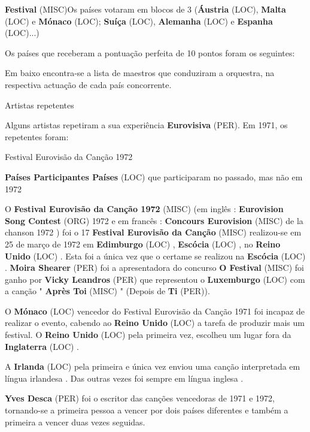 \documentclass[12pt,a4paper]{article}
\begin{document}
\textbf{Festival} (MISC)Os países votaram em blocos de 3 (\textbf{Áustria} (LOC), \textbf{Malta} (LOC) e \textbf{Mónaco} (LOC); \textbf{Suíça} (LOC), \textbf{Alemanha} (LOC) e \textbf{Espanha} (LOC)...)

Os países que receberam a pontuação perfeita de 10 pontos foram os seguintes:

Em baixo encontra-se a lista de maestros que conduziram a orquestra, na respectiva actuação de cada país concorrente.



Artistas repetentes

Alguns artistas repetiram a sua experiência \textbf{Eurovisiva} (PER). Em 1971, os repetentes foram:



Festival Eurovisão da Canção 1972



\textbf{Países Participantes Países} (LOC) que participaram no passado, mas não em 1972

O \textbf{Festival Eurovisão da Canção 1972} (MISC) (em inglês : \textbf{Eurovision Song Contest} (ORG) 1972 e em francês : \textbf{Concours Eurovision} (MISC) de la chanson 1972 ) foi o 17 \textbf{Festival Eurovisão da Canção} (MISC) realizou-se em 25 de março de 1972 em \textbf{Edimburgo} (LOC) , \textbf{Escócia} (LOC) , no \textbf{Reino Unido} (LOC) . Esta foi a única vez que o certame se realizou na \textbf{Escócia} (LOC) . \textbf{Moira Shearer} (PER) foi a apresentadora do concurso \textbf{O Festival} (MISC) foi ganho por \textbf{Vicky Leandros} (PER) que representou o \textbf{Luxemburgo} (LOC) com a canção " \textbf{Après Toi} (MISC) " (Depois de \textbf{Ti} (PER)).

O \textbf{Mónaco} (LOC) vencedor do Festival Eurovisão da Canção 1971 foi incapaz de realizar o evento, cabendo ao \textbf{Reino Unido} (LOC) a tarefa de produzir mais um festival. O \textbf{Reino Unido} (LOC) pela primeira vez, escolheu um lugar fora da \textbf{Inglaterra} (LOC) .

A \textbf{Irlanda} (LOC) pela primeira e única vez enviou uma canção interpretada em língua irlandesa . Das outras vezes foi sempre em língua inglesa .

\textbf{Yves Desca} (PER) foi o escritor das canções vencedoras de 1971 e 1972, tornando-se a primeira pessoa a vencer por dois países diferentes e também a primeira a vencer duas vezes seguidas.
\end{document}
